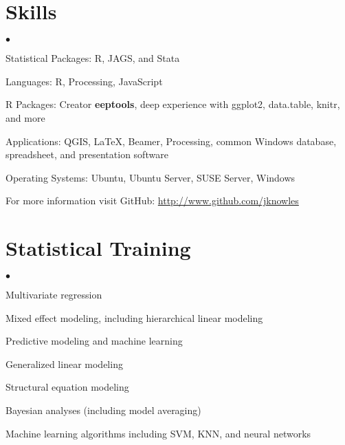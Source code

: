 \documentclass[margin,line]{res}
\newenvironment{list2}{
  \begin{list}{$\bullet$}{%
      \setlength{\itemsep}{0in}
      \setlength{\parsep}{0in} \setlength{\parskip}{0in}
      \setlength{\topsep}{0in} \setlength{\partopsep}{0in} 
      \setlength{\leftmargin}{0.2in}}}{\end{list}}
\begin{document}
\begin{resume}
\section{\sc Skills} 
\begin{list2}
\item Statistical Packages:  R, JAGS, and Stata
\item Languages:  R, Processing, JavaScript
\item R Packages: Creator \textbf{eeptools}, deep experience with ggplot2, data.table, knitr, and more
\item Applications: QGIS, \LaTeX, Beamer, Processing, common Windows
  database, spreadsheet, and presentation software
\item Operating Systems:  Ubuntu, Ubuntu Server, SUSE Server, Windows
\item For more information visit GitHub: \url{http://www.github.com/jknowles}\\
\end{list2}

\vspace{-.5cm}
\section{\sc Statistical Training}
\begin{list2}
\item Multivariate regression
\item Mixed effect modeling, including hierarchical linear modeling
\item Predictive modeling and machine learning
\item Generalized linear modeling
\item Structural equation modeling
\item Bayesian analyses (including model averaging)
\item Machine learning algorithms including SVM, KNN, and neural networks 
\end{list2}

\vspace{-2mm}


\end{resume}
\end{document}
